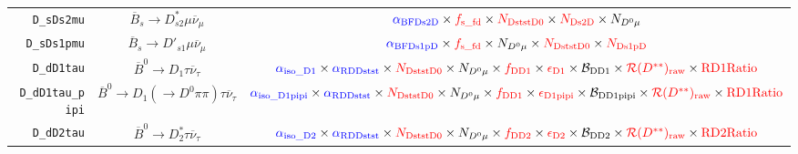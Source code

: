 \begin{landscape}
\begin{table}
\begin{tabular}{r|c|c}
       \texttt{D\_sDs2mu} &             $\overline{B}_s \rightarrow D_{s2}^* \mu \overline{\nu}_\mu$             &                                                                                               $\textcolor{blue}{\alpha_\text{BFDs2D}} \times \textcolor{red}{f_\text{s\_fd}} \times \textcolor{red}{N_\text{DststD0}} \times \textcolor{red}{N_\text{Ds2D}} \times N_{D^0 \mu}$                                                                                               \\
      \texttt{D\_sDs1pmu} &             $\overline{B}_s \rightarrow D'_{s1} \mu \overline{\nu}_\mu$              &                                                                                              $\textcolor{blue}{\alpha_\text{BFDs1pD}} \times \textcolor{red}{f_\text{s\_fd}} \times N_{D^0 \mu} \times \textcolor{red}{N_\text{DststD0}} \times \textcolor{red}{N_\text{Ds1pD}}$                                                                                              \\
       \texttt{D\_dD1tau} &              $\overline{B}^0 \rightarrow D_1 \tau \overline{\nu}_\tau$               &       $\textcolor{blue}{\alpha_\text{iso\_D1}} \times \textcolor{blue}{\alpha_\text{RDDstst}} \times \textcolor{red}{N_\text{DststD0}} \times N_{D^0 \mu} \times \textcolor{red}{f_\text{DD1}} \times \textcolor{red}{\epsilon_\text{D1}} \times \mathcal{B}_\text{DD1} \times \textcolor{red}{\mathcal{R}(D^{**})_\text{raw}} \times \textcolor{red}{\text{RD1Ratio}}$       \\
 \texttt{D\_dD1tau\_pipi} &  $\overline{B}^0 \rightarrow D_1 (\rightarrow D^0 \pi\pi) \tau \overline{\nu}_\tau$  & $\textcolor{blue}{\alpha_\text{iso\_D1pipi}} \times \textcolor{blue}{\alpha_\text{RDDstst}} \times \textcolor{red}{N_\text{DststD0}} \times N_{D^0 \mu} \times \textcolor{red}{f_\text{DD1}} \times \textcolor{red}{\epsilon_\text{D1pipi}} \times \mathcal{B}_\text{DD1pipi} \times \textcolor{red}{\mathcal{R}(D^{**})_\text{raw}} \times \textcolor{red}{\text{RD1Ratio}}$ \\
       \texttt{D\_dD2tau} &             $\overline{B}^0 \rightarrow D^*_2 \tau \overline{\nu}_\tau$              &       $\textcolor{blue}{\alpha_\text{iso\_D2}} \times \textcolor{blue}{\alpha_\text{RDDstst}} \times \textcolor{red}{N_\text{DststD0}} \times N_{D^0 \mu} \times \textcolor{red}{f_\text{DD2}} \times \textcolor{red}{\epsilon_\text{D2}} \times \mathcal{B}_\text{DD2} \times \textcolor{red}{\mathcal{R}(D^{**})_\text{raw}} \times \textcolor{red}{\text{RD2Ratio}}$       \\

\end{tabular}
\end{table}
\end{landscape}
